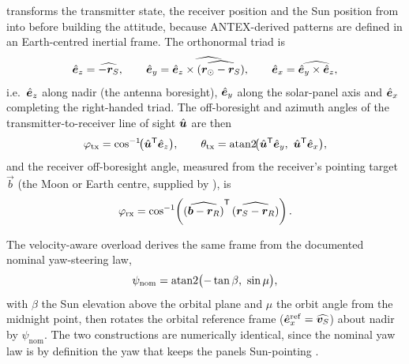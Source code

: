  transforms the transmitter state, the receiver position and
the Sun position from  into  before
building the attitude, because ANTEX-derived patterns are defined in an
Earth-centred inertial frame. The orthonormal triad is
\begin{equation}
  \label{eq:gnss-attitude}
  \hat{\bm{e}}_z = \widehat{-\bm{r}_S}, \qquad
  \hat{\bm{e}}_y = \widehat{\hat{\bm{e}}_z \times \widehat{(\bm{r}_\odot - \bm{r}_S)}}, \qquad
  \hat{\bm{e}}_x = \widehat{\hat{\bm{e}}_y \times \hat{\bm{e}}_z},
\end{equation}
i.e.\ $\hat{\bm{e}}_z$ along nadir (the antenna boresight), $\hat{\bm{e}}_y$ along the
solar-panel axis and $\hat{\bm{e}}_x$ completing the right-handed triad. The
off-boresight and azimuth angles of the transmitter-to-receiver line of sight
$\hat{\bm{u}}$ are then
\begin{equation}
  \label{eq:gnss-boresight}
  \varphi_{\mathrm{tx}} = \cos^{-1}\!\bigl(\uvec{u}\transpose\uvec{e}_z\bigr),
  \qquad
  \theta_{\mathrm{tx}} = \atantwo\!\bigl(\uvec{u}\transpose\uvec{e}_y,\ \uvec{u}\transpose\uvec{e}_x\bigr),
\end{equation}
and the receiver off-boresight angle, measured from the receiver's pointing
target $\vec{b}$ (the Moon or Earth centre, supplied by
), is
\begin{equation}
  \label{eq:gnss-boresight-rx}
  \varphi_{\mathrm{rx}}
  = \cos^{-1}\!\left(
      \widehat{(\bm{b} - \bm{r}_R)}^{\mathsf{T}}\,\widehat{(\bm{r}_S - \bm{r}_R)}
    \right).
\end{equation}

The velocity-aware overload derives the same frame from the documented nominal
yaw-steering law,
\begin{equation}
  \label{eq:gnss-yaw}
  \psi_{\mathrm{nom}} = \atantwo\bigl(-\tan\beta,\ \sin\mu\bigr),
\end{equation}
with $\beta$ the Sun elevation above the orbital plane and $\mu$ the orbit
angle from the midnight point, then rotates the orbital reference frame
($\hat{\bm{e}}_x^{\mathrm{ref}} = \widehat{\bm{v}_S}$) about nadir by
$\psi_{\mathrm{nom}}$. The two constructions are numerically identical, since
the nominal yaw law is by definition the yaw that keeps the panels
Sun-pointing \citep{kouba2009yaw,cheng2025yaw}.

